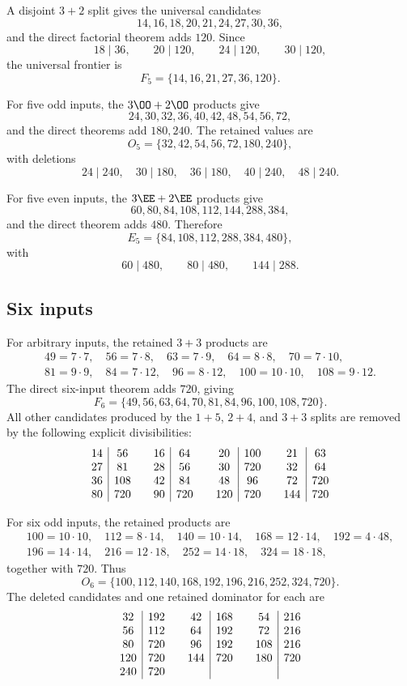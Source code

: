 A disjoint $3+2$ split gives the universal candidates
\[
14,16,18,20,21,24,27,30,36,
\]
and the direct factorial theorem adds $120$.  Since
\[
18\mid36,\qquad20\mid120,\qquad24\mid120,\qquad30\mid120,
\]
the universal frontier is
\[
F_5=\{14,16,21,27,36,120\}.
\]

For five odd inputs, the $3\OO+2\OO$ products give
\[
24,30,32,36,40,42,48,54,56,72,
\]
and the direct theorems add $180,240$.  The retained values are
\[
O_5=\{32,42,54,56,72,180,240\},
\]
with deletions
\[
24\mid240,\quad30\mid180,\quad36\mid180,
\quad40\mid240,\quad48\mid240.
\]

For five even inputs, the $3\EE+2\EE$ products give
\[
60,80,84,108,112,144,288,384,
\]
and the direct theorem adds $480$.  Therefore
\[
E_5=\{84,108,112,288,384,480\},
\]
with
\[
60\mid480,\qquad80\mid480,\qquad144\mid288.
\]

\subsection{Six inputs}

For arbitrary inputs, the retained $3+3$ products are
\[
\begin{gathered}
49=7\cdot7,\quad56=7\cdot8,\quad63=7\cdot9,
\quad64=8\cdot8,\quad70=7\cdot10,\\
81=9\cdot9,\quad84=7\cdot12,\quad96=8\cdot12,
\quad100=10\cdot10,\quad108=9\cdot12.
\end{gathered}
\]
The direct six-input theorem adds $720$, giving
\[
F_6=\{49,56,63,64,70,81,84,96,100,108,720\}.
\]
All other candidates produced by the $1+5$, $2+4$, and $3+3$ splits are
removed by the following explicit divisibilities:
\[
\begin{array}{c|c@{\qquad}c|c@{\qquad}c|c@{\qquad}c|c}
14&56 &16&64 &20&100 &21&63\\
27&81 &28&56 &30&720 &32&64\\
36&108&42&84 &48&96  &72&720\\
80&720&90&720&120&720&144&720
\end{array}
\]

For six odd inputs, the retained products are
\[
\begin{gathered}
100=10\cdot10,\quad112=8\cdot14,\quad140=10\cdot14,
\quad168=12\cdot14,\quad192=4\cdot48,\\
196=14\cdot14,\quad216=12\cdot18,\quad252=14\cdot18,
\quad324=18\cdot18,
\end{gathered}
\]
together with $720$.  Thus
\[
O_6=\{100,112,140,168,192,196,216,252,324,720\}.
\]
The deleted candidates and one retained dominator for each are
\[
\begin{array}{c|c@{\qquad}c|c@{\qquad}c|c}
32&192 &42&168 &54&216\\
56&112 &64&192 &72&216\\
80&720 &96&192 &108&216\\
120&720&144&720&180&720\\
240&720&&&
\end{array}
\]

